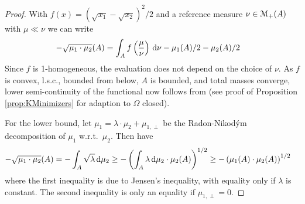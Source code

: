 \begin{proof}
	With $f(x) = (\sqrt{x_1}-\sqrt{x_2})^2/2$ and a reference measure $\nu \in \mathcal{M}_+(A)$ with $\mu \ll \nu$ we can write
	\begin{align*}
		-\sqrt{\mu_1 \cdot \mu_2}(A) & = \int_A f\left( \frac{\mu}{\nu} \right)\,\mathrm{d}\nu - \mu_1(A)/2 - \mu_2(A)/2
	\end{align*}
	Since $f$ is 1-homogeneous, the evaluation does not depend on the choice of $\nu$. As $f$ is convex, l.s.c., bounded from below, $A$ is bounded, and total masses converge, lower semi-continuity of the functional now follows from \cite[Thm.~2.38]{ambrosio2000functions} (see proof of Proposition \ref{prop:KMinimizers} for adaption to $\Omega$ closed).
		
	For the lower bound, let $\mu_1 = \lambda \cdot \mu_2 + \mu_{1,\perp}$ be the Radon-Nikod\'ym decomposition of $\mu_1$ w.r.t.~$\mu_2$. Then have
	\begin{align*}
		-\sqrt{\mu_1 \cdot \mu_2}(A) & = - \int_A \sqrt{\lambda}\, \mathrm{d}\mu_2
			\geq - \left( \int_A \lambda\, \mathrm{d}\mu_2 \cdot \mu_2(A) \right)^{1/2}
			\geq -\left(\mu_1(A) \cdot \mu_2(A) \right)^{1/2}
	\end{align*}
	where the first inequality is due to Jensen's inequality, with equality only if $\lambda$ is constant. The second inequality is only an equality if $\mu_{1,\perp}=0$.
\end{proof}


